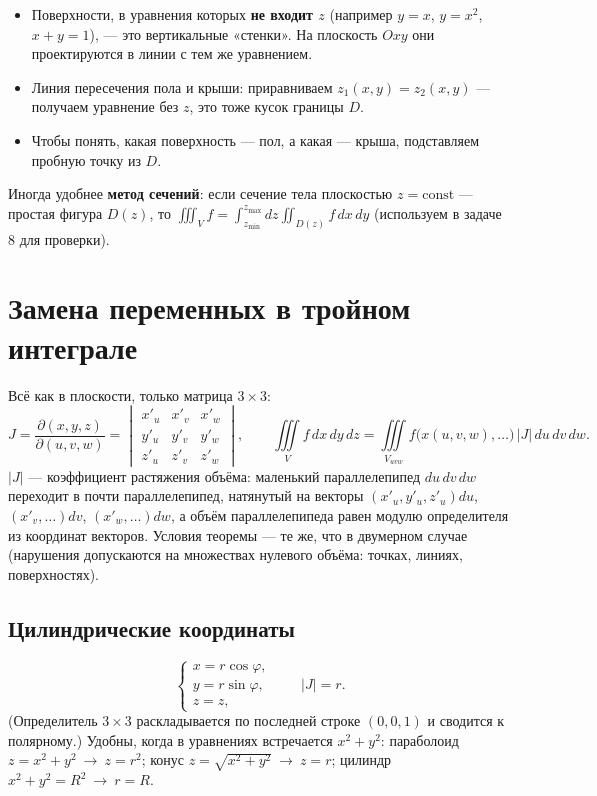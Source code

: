 \begin{notebox}
\begin{itemize}
\item Поверхности, в уравнения которых \textbf{не входит $z$} (например $y=x$, $y=x^2$, $x+y=1$), --- это вертикальные «стенки». На плоскость $Oxy$ они проектируются в линии с тем же уравнением.
\item Линия пересечения пола и крыши: приравниваем $z_1(x,y)=z_2(x,y)$ --- получаем уравнение без $z$, это тоже кусок границы $D$.
\item Чтобы понять, какая поверхность --- пол, а какая --- крыша, подставляем пробную точку из $D$.
\end{itemize}
\end{notebox}

Иногда удобнее \textbf{метод сечений}: если сечение тела плоскостью $z=\mathrm{const}$ --- простая фигура $D(z)$, то
$\iiint_V f=\int_{z_{\min}}^{z_{\max}}dz\iint_{D(z)}f\,dx\,dy$ (используем в задаче 8 для проверки).

\section{Замена переменных в тройном интеграле}
Всё как в плоскости, только матрица $3\times3$:
\[
J=\frac{\partial(x,y,z)}{\partial(u,v,w)}=\begin{vmatrix}x'_u&x'_v&x'_w\\ y'_u&y'_v&y'_w\\ z'_u&z'_v&z'_w\end{vmatrix},\qquad
\iiint\limits_{V} f\,dx\,dy\,dz=\iiint\limits_{V_{uvw}} f\bigl(x(u,v,w),\dots\bigr)\,|J|\,du\,dv\,dw .
\]
$|J|$ --- коэффициент растяжения объёма: маленький параллелепипед $du\,dv\,dw$ переходит в почти параллелепипед, натянутый на векторы $(x'_u,y'_u,z'_u)du$, $(x'_v,\dots)dv$, $(x'_w,\dots)dw$, а объём параллелепипеда равен модулю определителя из координат векторов. Условия теоремы --- те же, что в двумерном случае (нарушения допускаются на множествах нулевого объёма: точках, линиях, поверхностях).

\subsection{Цилиндрические координаты}
\[
\begin{cases}x=r\cos\varphi,\\ y=r\sin\varphi,\\ z=z,\end{cases}\qquad |J|=r .
\]
(Определитель $3\times3$ раскладывается по последней строке $(0,0,1)$ и сводится к полярному.) Удобны, когда в уравнениях встречается $x^2+y^2$:
параболоид $z=x^2+y^2\ \to\ z=r^2$; конус $z=\sqrt{x^2+y^2}\ \to\ z=r$; цилиндр $x^2+y^2=R^2\ \to\ r=R$.

